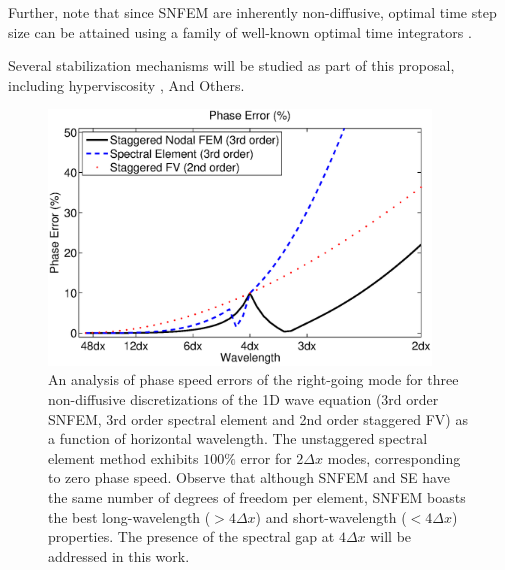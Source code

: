 \documentclass[11pt]{article}
\begin{document}
Further, note that since SNFEM are inherently non-diffusive, optimal time step size can be attained using a family of well-known optimal time integrators \cite{kinnmark1984one}.




Several stabilization mechanisms will be studied as part of this proposal, including hyperviscosity \citep{guba2014viscosity, ullrich2014global}, {\color{blue} And Others}.

\begin{figure}
\begin{center}
\includegraphics[width=4in]{PhaseErrors}
\end{center}
\caption{An analysis of phase speed errors of the right-going mode for three non-diffusive discretizations of the 1D wave equation (3rd order SNFEM, 3rd order spectral element and 2nd order staggered FV) as a function of horizontal wavelength.  The unstaggered spectral element method exhibits $100\%$ error for $2 \Delta x$ modes, corresponding to zero phase speed.  Observe that although SNFEM and SE have the same number of degrees of freedom per element, SNFEM boasts the best long-wavelength ($> 4 \Delta x$) and short-wavelength ($< 4 \Delta x$) properties.  The presence of the spectral gap at $4 \Delta x$ will be addressed in this work.} \label{fig:SNFEMEigenstructure}
\end{figure}
\end{document}
